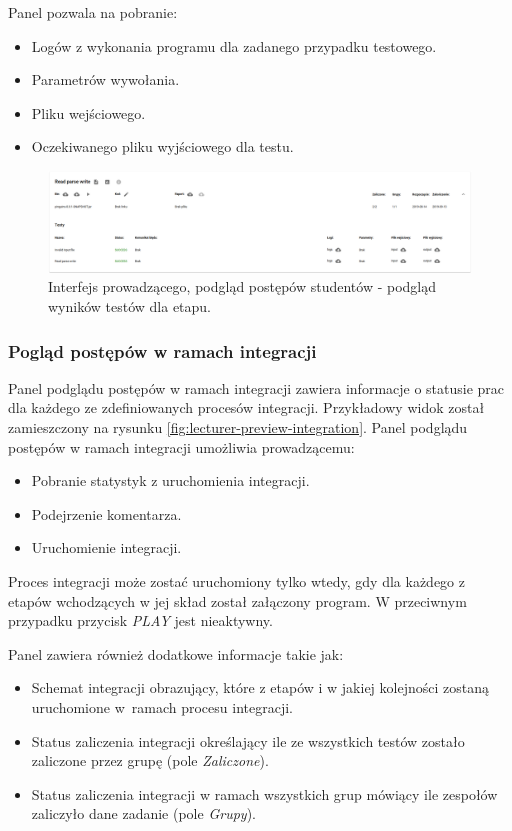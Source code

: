Panel pozwala na pobranie:
\begin{itemize}
    \item Logów z wykonania programu dla zadanego przypadku testowego.
    \item Parametrów wywołania.
    \item Pliku wejściowego.
    \item Oczekiwanego pliku wyjściowego dla testu.
\end{itemize}

\begin{figure}[h]
    \centering
    \includegraphics[width = 13cm]{chapter04/lecturer_preview_stage_tests.png}
    \caption{Interfejs prowadzącego, podgląd postępów studentów - podgląd wyników testów dla etapu.}
    \label{fig:lecturer-preview-stage-tests}
\end{figure}

\subsubsection{Pogląd postępów w ramach integracji}

Panel podglądu postępów w ramach integracji zawiera informacje o statusie prac dla każdego ze zdefiniowanych procesów integracji.
Przykładowy widok został zamieszczony na rysunku \ref{fig:lecturer-preview-integration}.
Panel podglądu postępów w ramach integracji umożliwia prowadzącemu:
\begin {itemize}
    \item Pobranie statystyk z uruchomienia integracji.
    \item Podejrzenie komentarza.
    \item Uruchomienie integracji.
\end {itemize}
Proces integracji może zostać uruchomiony tylko wtedy, gdy dla każdego z etapów wchodzących w jej skład został załączony program.
W przeciwnym przypadku przycisk \textit{PLAY} jest nieaktywny.

Panel zawiera również dodatkowe informacje takie jak:
\begin{itemize}
    \item Schemat integracji obrazujący, które z etapów i w jakiej kolejności zostaną uruchomione w~ramach procesu integracji.
    \item Status zaliczenia integracji określający ile ze wszystkich testów zostało zaliczone przez grupę (pole \textit{Zaliczone}).
    \item Status zaliczenia integracji w ramach wszystkich grup mówiący ile zespołów zaliczyło dane zadanie (pole \textit{Grupy}).
\end{itemize}

